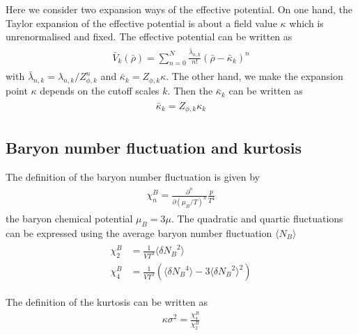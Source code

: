 \documentclass[%
reprint,
superscriptaddress,
showpacs,preprintnumbers,
 amsmath,amssymb,
 aps,
prd,
]{revtex4-1}
\begin{document}
Here we consider two expansion ways of the effective potential. On one hand, the Taylor expansion of the effective 
potential is about a field value $\kappa$ which is unrenormalised and fixed. The effective potential can be written as
\begin{align}\label{}
\begin{split}
\bar{V}_k(\bar{\rho})=\sum^{N}_{n=0}\frac{\bar{\lambda}_{n,k}}{n!}(\bar{\rho}-\bar{\kappa}_k)^n
\end{split}
\end{align}
with $\bar{\lambda}_{n,k}=\lambda_{n,k}/Z^{n}_{\phi,k}$ and $\bar{\kappa}_k=Z_{\phi,k}\kappa$.
The other hand, we make the expansion point $\kappa$ depends on the cutoff scales $k$. Then the $\bar{\kappa}_k$ 
can be written as
\begin{align}\label{}
\begin{split}
\bar{\kappa}_k=Z_{\phi,k}\kappa_k
\end{split}
\end{align} 



\subsection{Baryon number fluctuation and kurtosis}
The definition of the baryon number fluctuation is given by
\begin{align}\label{}
\begin{split}
\chi^{B}_{n}=\frac{\partial^n}{\partial(\mu_B/T)^n}\frac{p}{T^4}
\end{split}
\end{align} 
the baryon chemical potential $\mu_B=3\mu$. The quadratic and quartic fluctuations can be expressed using the 
average baryon number fluctuation $\langle N_B \rangle$
\begin{align}\label{}
\begin{split}
\chi^{B}_{2}&=\frac{1}{VT^3}\langle \delta {N_B}^2 \rangle\\
\chi^{B}_{4}&=\frac{1}{VT^3}\left( \langle \delta {N_B}^4 \rangle-3\langle \delta {N_B}^2 \rangle^2 \right)
\end{split}
\end{align}

The definition of the kurtosis can be written as
\begin{align}
\kappa \sigma^2=\frac{\chi^{B}_{4}}{\chi^{B}_{2}}
\end{align}


\end{document}
